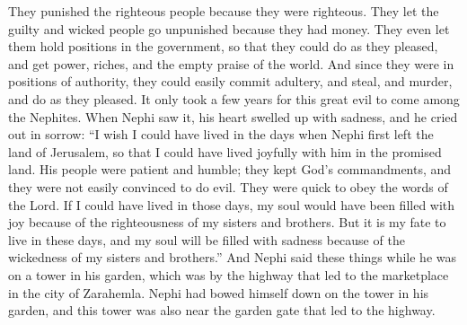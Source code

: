 They punished the righteous people because they were righteous. They let the guilty and wicked people go unpunished because they had money. They even let them hold positions in the government, so that they could do as they pleased, and get power, riches, and the empty praise of the world.  And since they were in positions of authority, they could easily commit adultery, and steal, and murder, and do as they pleased.
\bverse \iffalse Now this great iniquity had come upon the Nephites, in the space of not many years; and when Nephi saw it, his heart was swollen with sorrow within his breast; and he did exclaim in the agony of his soul: \fi
It only took a few years for this great evil to come among the Nephites. When Nephi saw it, his heart swelled up with sadness, and he cried out in sorrow:
\bverse \iffalse Oh, that I could have had my days in the days when my father Nephi first came out of the land of Jerusalem, that I could have joyed with him in the promised land; then were his people easy to be entreated, firm to keep the commandments of God, and slow to be led to do iniquity; and they were quick to hearken unto the words of the Lord-- \fi
``I wish I could have lived in the days when Nephi first left the land of Jerusalem, so that I could have lived joyfully with him in the promised land. His people were patient and humble; they kept God's commandments, and they were not easily convinced to do evil. They were quick to obey the words of the Lord.
\bverse \iffalse Yea, if my days could have been in those days, then would my soul have had joy in the righteousness of my brethren. \fi
If I could have lived in those days, my soul would have been filled with joy because of the righteousness of my sisters and brothers.
\bverse \iffalse But behold, I am consigned that these are my days, and that my soul shall be filled with sorrow because of this the wickedness of my brethren. \fi
But it is my fate to live in these days, and my soul will be filled with sadness because of the wickedness of my sisters and brothers.''
\bverse \iffalse And behold, now it came to pass that it was upon a tower, which was in the garden of Nephi, which was by the highway which led to the chief market, which was in the city of Zarahemla; therefore, Nephi had bowed himself upon the tower which was in his garden, which tower was also near unto the garden gate by which led the highway. \fi
And Nephi said these things while he was on a tower in his garden, which was by the highway that led to the marketplace in the city of Zarahemla. Nephi had bowed himself down on the tower in his garden, and this tower was also near the garden gate that led to the highway.
